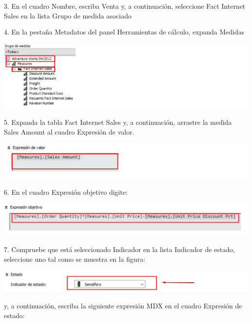 3. En el cuadro Nombre, escriba Venta y, a continuación, seleccione Fact Internet Sales en la lista Grupo de medida
asociado

4. En la pestaña Metadatos del panel Herramientas de cálculo, expanda Medidas

	\begin{center}
	\includegraphics[width=\columnwidth]{images/task8/img3}
	\end{center}	


5. Expanda la tabla Fact Internet Sales y, a continuación, arrastre la medida Sales Amount al cuadro Expresión de
valor.

	\begin{center}
	\includegraphics[width=\columnwidth]{images/task8/img4}
	\end{center}	


6. En el cuadro Expresión objetivo digite:

	\begin{center}
	\includegraphics[width=\columnwidth]{images/task8/img5}
	\end{center}	

7. Compruebe que está seleccionado Indicador en la lista Indicador de estado, seleccione uno tal como se muestra
en la figura:

	\begin{center}
	\includegraphics[width=\columnwidth]{images/task8/img6}
	\end{center}	

y, a continuación, escriba la siguiente expresión MDX en el cuadro Expresión de estado:

